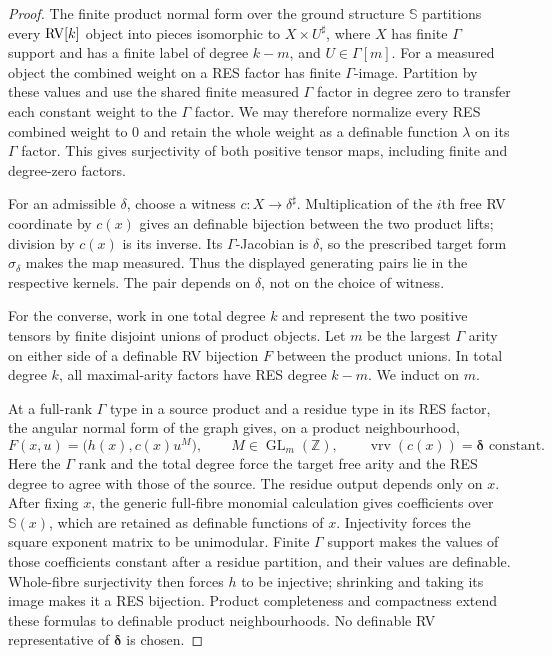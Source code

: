 \documentclass[12pt]{amsart}
\theoremstyle{plain}
\theoremstyle{definition}
\theoremstyle{remark}
\numberwithin{equation}{section}
\theoremstyle{plain}
\newcommand{\RV}{\textup{RV}}
\newcommand{\0}{\emptyset}
\DeclareMathOperator{\vrv}{vrv}
\begin{document}
\begin{proof}
The finite product normal form over the ground structure $\mathbb S$ partitions
every $\RV[k]$ object into pieces isomorphic to
$X\times U^\sharp$, where $X$ has finite $\Gamma$ support and has a
finite label of degree $k-m$, and $U\in\Gamma[m]$. For a measured
object the combined weight on a RES factor has finite
$\Gamma$-image. Partition by these values and use the shared finite
measured $\Gamma$ factor in degree zero to transfer each constant weight
to the $\Gamma$ factor. We may therefore normalize every RES combined
weight to $0$ and retain the whole weight as a definable function
$\lambda$ on its $\Gamma$ factor. This gives surjectivity of both positive
tensor maps, including finite and degree-zero factors.

For an admissible $\delta$, choose a witness $c:X\to\delta^\sharp$.
Multiplication of the $i$th free RV coordinate by $c(x)$ gives an
definable bijection between the two product lifts;
division by $c(x)$ is its inverse. Its $\Gamma$-Jacobian is $\delta$,
so the prescribed target form $\sigma_\delta$ makes the map measured.
Thus the displayed generating pairs lie in the respective kernels.
The pair depends on $\delta$, not on the choice of witness.

For the converse, work in one total degree $k$ and represent the two
positive tensors by finite disjoint unions of product objects.
Let $m$ be the largest $\Gamma$ arity on either side of a definable
RV bijection $F$ between the product unions. In total degree $k$, all
maximal-arity factors have RES degree $k-m$. We induct on $m$.

At a full-rank $\Gamma$ type in a source product and a residue type in
its RES factor, the angular normal form of the graph gives, on a
product neighbourhood,
\[
 F(x,u)=\bigl(h(x),c(x)u^M\bigr),\qquad
 M\in\operatorname{GL}_m(\mathbb Z),\qquad
 \vrv(c(x))=\boldsymbol\delta\text{ constant}.
\]
Here the $\Gamma$ rank and the total degree force the target free arity
and the RES degree to agree with those of the source. The residue
output depends only on $x$. After fixing $x$, the generic full-fibre
monomial calculation gives coefficients over $\mathbb S(x)$, which
are retained as definable functions of $x$. Injectivity forces the
square exponent matrix to be unimodular. Finite $\Gamma$ support makes
the values of those coefficients constant after a residue partition,
and their values are definable. Whole-fibre
surjectivity then forces $h$ to be injective; shrinking and taking its
image makes it a RES bijection. Product completeness and compactness
extend these formulas to definable product neighbourhoods. No
definable RV representative of $\boldsymbol\delta$ is chosen.


\end{proof}
\end{document}
